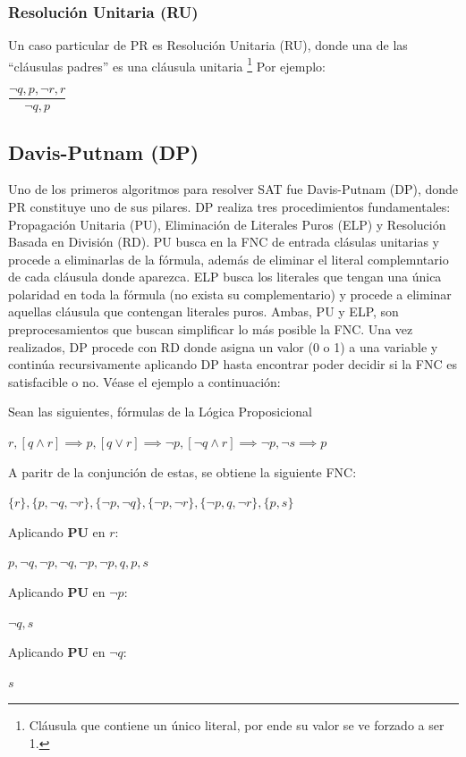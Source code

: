 \subsubsection{Resolución Unitaria (RU)}
Un caso particular de PR es Resolución Unitaria (RU), donde una de las ``cláusulas padres'' es una cláusula unitaria \footnote{Cláusula que contiene un único literal, por ende su valor se ve forzado a ser 1.} Por ejemplo:

$\dfrac{{\neg q, p, \neg r},{r}}{{\neg q, p}}$

\subsection{Davis-Putnam (DP)}
Uno de los primeros algoritmos para resolver SAT fue Davis-Putnam (DP), donde PR constituye uno de sus pilares. DP realiza tres procedimientos fundamentales: Propagación Unitaria (PU), Eliminación de Literales Puros (ELP) y Resolución Basada en División (RD). PU busca en la FNC de entrada clásulas unitarias y procede a eliminarlas de la fórmula, además de eliminar el literal complemntario de cada cláusula donde aparezca. ELP busca los literales que tengan una única polaridad en toda la fórmula (no exista su complementario) y procede a eliminar aquellas cláusula que contengan literales puros. Ambas, PU y ELP, son preprocesamientos que buscan simplificar lo más posible la FNC. Una vez realizados, DP procede con RD donde asigna un valor (0 o 1) a una variable y continúa recursivamente aplicando DP hasta encontrar poder decidir si la FNC es satisfacible o no. Véase el ejemplo a continuación:

Sean las siguientes, fórmulas de la Lógica Proposicional

$r, [q \land r] \implies p, [q \lor r] \implies \neg p, [\neg q \land r] \implies \neg p, \neg s \implies p$

A paritr de la conjunción de estas, se obtiene la siguiente FNC:

${\{r\}, \{p,\neg q, \neg r\}, \{\neg p, \neg q\}, \{\neg p, \neg r\}, \{\neg p,q,\neg r\}, \{p,s\}}$


Aplicando \textbf{PU} en ${r}$:

${{p,\neg q},{\neg p,\neg q},{\neg p},{\neg p,q},{p,s}}$

Aplicando \textbf{PU} en ${\neg p}$:

${{\neg q},{s}}$

Aplicando \textbf{PU} en ${\neg q}$:

${{s}}$

